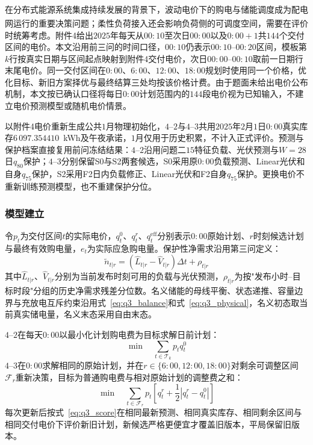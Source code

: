 \documentclass[12pt,a4paper]{ctexart}
\newcommand{\upcite}[1]{\textsuperscript{\cite{#1}}}
\theoremstyle{definition}
\theoremstyle{plain}
\theoremstyle{remark}
\begin{document}
在分布式能源系统集成持续发展的背景下\upcite{li2023review}，波动电价下的购电与储能调度成为配电网运行的重要决策问题；柔性负荷接入还会影响负荷侧的可调度空间\upcite{qi2020distribution}，需要在评价时统筹考虑。附件4给出$2025$年每天从$00{:}10$至次日$00{:}00$以及$0{:}00{+}1$共$144$个交付区间的电价。本文沿用前三问的时间口径，$00{:}10$仍表示$00{:}10$--$00{:}20$区间，模板第$k$行按真实日期与区间起点映射到附件4交付电价，次日$00{:}00$--$00{:}10$取前一日期行末尾电价。同一交付区间在$0{:}00$、$6{:}00$、$12{:}00$、$18{:}00$规划时使用同一个价格，优化目标、新旧方案择优与最终结算三处均按该价格计费。由于题面未给出电价公布机制，本文按已确认口径将每日$0{:}00$计划范围内的$144$段电价视为已知输入，不建立电价预测模型或随机电价情景。

以附件4电价重新生成公共$1$月物理初始化，$4$--$2$与$4$--$3$共用$2025$年$2$月$1$日$0{:}00$真实库存$6\,097.354410$~kWh及午夜承诺，$1$月仅用于历史积累，不计入正式评价。预测与保护档案直接复用前问冻结结果：$4$--$2$沿用问题二$15$特征负载、光伏预测与$W=28$日$q_{80}$保护；$4$--$3$分别保留S0与S2两套候选，S0采用原$0{:}00$负载预测、Linear光伏和自身$q_{75}$保护，S2采用F2日内负载修正、Linear光伏和F2自身$q_{75}$保护。更换电价不重新训练预测模型，也不重建保护分位。

\subsubsection{模型建立}

令$p_t$为交付区间$t$的实际电价，$q_t^{0}$、$q_t^{r}$、$q_t^{\mathrm{eff}}$分别表示$0{:}00$原始计划、$r$时刻候选计划与最终有效购电量，$e_t$为实际应急购电量。保护性净需求沿用第三问定义：
\begin{equation}
  \widetilde{n}_{t|r}=(\widehat{L}_{t|r}-\widehat{V}_{t|r})\Delta t+\rho_{t|r}
  \label{eq:q4_protected}
\end{equation}
\noindent 其中$\widehat{L}_{t|r}$、$\widehat{V}_{t|r}$分别为当前发布时刻可用的负载与光伏预测，$\rho_{t|r}$为按"发布小时--目标时段"分组的历史净需求残差分位数。名义储能的母线平衡、状态递推、容量边界与充放电互斥约束沿用式~\eqref{eq:q3_balance}和式~\eqref{eq:q3_physical}，名义初态取当前真实储电量，名义末态采用自由末态。

$4$--$2$在每天$0{:}00$以最小化计划购电费为目标求解日前计划：
\begin{equation}
  \min \quad \sum_{t\in\mathcal{T}_k} p_t q_t^{0}
  \label{eq:q4_obj42}
\end{equation}
\noindent $4$--$3$在$0{:}00$求解相同的原始计划，并在$r\in\{6{:}00,12{:}00,18{:}00\}$对剩余可调整区间$\mathcal{F}_r$重新决策，目标为普通购电费与相对原始计划的调整费之和：
\begin{equation}
  \min \quad \sum_{t\in\mathcal{F}_r}
  p_t\left[q_t^{r}+\frac{1}{2}\left|q_t^{r}-q_t^{0}\right|\right]
  \label{eq:q4_obj43r}
\end{equation}
\noindent 每次更新后按式~\eqref{eq:q3_score}在相同最新预测、相同真实库存、相同剩余区间与相同交付电价下评价新旧计划，新候选严格更便宜才覆盖旧版本，平局保留旧版本。
\end{document}
